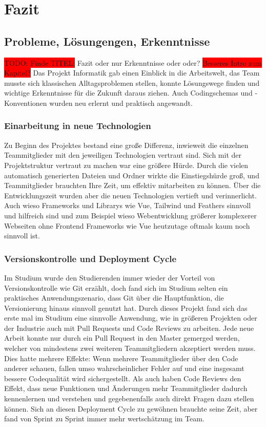 \documentclass[10pt, a4paper, draft]{article}
\begin{document}
\section{Fazit}
\subsection{Probleme, Lösungengen, Erkenntnisse}
\colorbox{red}{TODO: Finde TITEL:} Fazit oder nur Erkenntnisse oder oder?
\colorbox{red}{Besseres Intro zum Kapitel?}
Das Projekt Informatik gab einen Einblick in die Arbeitswelt, das Team musste sich klassischen Alltagsproblemen stellen, konnte Lösungswege finden und wichtige Erkenntnisse für die Zukunft daraus ziehen.
Auch Codingschemas und -Konventionen wurden neu erlernt und praktisch angewandt.

\subsubsection{Einarbeitung in neue Technologien}
Zu Beginn des Projektes bestand eine große Differenz, inwieweit die einzelnen Teammitglieder mit den jeweiligen Technologien vertraut sind.
Sich mit der Projektstruktur vertraut zu machen war eine größere Hürde.
Durch die vielen automatisch generierten Dateien und Ordner wirkte die Einstiegshürde groß, und Teammitglieder brauchten Ihre Zeit, um effektiv mitarbeiten zu können.
Über die Entwicklungszeit wurden aber die neuen Technologien vertieft und verinnerlicht.
Auch wieso Frameworks und Librarys wie Vue, Tailwind und Feathers sinnvoll und hilfreich sind und zum Beispiel wieso Webentwicklung größerer komplexerer Webseiten ohne Frontend Frameworks wie Vue heutzutage oftmals kaum noch sinnvoll ist\cite{stackoverflow:why_Frameworks}.

\subsubsection{Versionskontrolle und Deployment Cycle}
Im Studium wurde den Studierenden immer wieder der Vorteil von Versionskontrolle wie Git erzählt, doch fand sich im Studium selten ein praktisches Anwendungszenario, dass Git über die Hauptfunktion, die Versionierung hinaus sinnvoll genutzt hat.
Durch dieses Projekt fand sich das erste mal im Studium eine sinnvolle Anwendung, wie in größeren Projekten oder der Industrie auch mit Pull Requests und Code Reviews zu arbeiten.
Jede neue Arbeit konnte nur durch ein Pull Request in den Master gemerged werden, welcher von mindestens zwei weiteren Teammitgliedern akzeptiert werden muss.
Dies hatte mehrere Effekte: Wenn mehrere Teammitglieder über den Code anderer schauen, fallen umso wahrscheinlicher Fehler auf und eine insgesamt bessere Codequalität wird sichergestellt.
Als auch haben Code Reviews den Effekt, dass neue Funktionen und Änderungen mehr Teammitglieder dadurch kennenlernen und verstehen und gegebenenfalls auch direkt Fragen dazu stellen können.
Sich an diesen Deployment Cycle zu gewöhnen brauchte seine Zeit, aber fand von Sprint zu Sprint immer mehr wertschätzung im Team.
\end{document}
